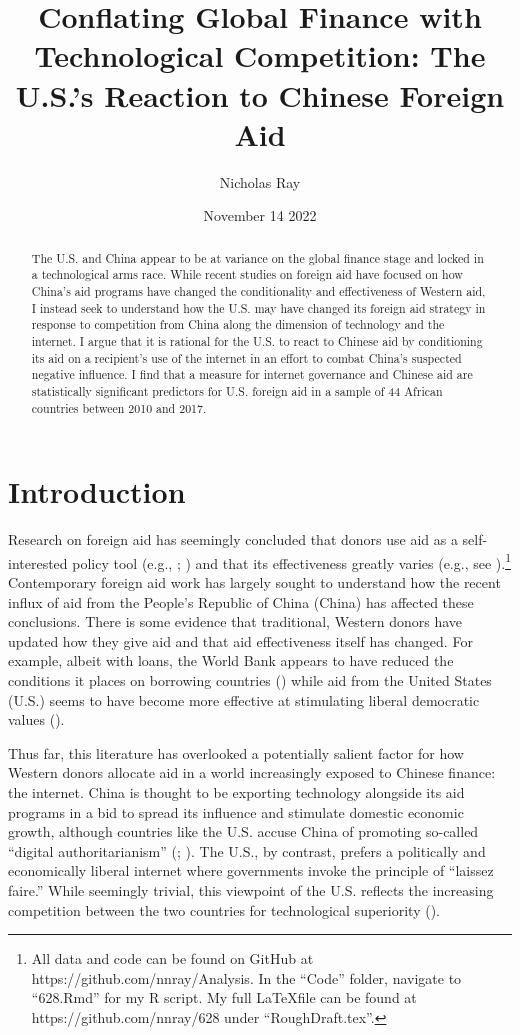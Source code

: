 \documentclass[12pt]{article}
\title{\vspace{-2.75cm}Conflating Global Finance with Technological Competition: The U.S.'s Reaction to Chinese Foreign Aid\vspace{-0.5cm}}
\author{Nicholas Ray}
\date{\vspace{-0.30cm}November 14 2022\vspace{-1cm}}
\begin{document}
\maketitle
\begin{abstract}
    The U.S. and China appear to be at variance on the global finance stage and locked in a technological arms race. While recent studies on foreign aid have focused on how China's aid programs have changed the conditionality and effectiveness of Western aid, I instead seek to understand how the U.S. may have changed its foreign aid strategy in response to competition from China along the dimension of technology and the internet. I argue that it is rational for the U.S. to react to Chinese aid by conditioning its aid on a recipient's use of the internet in an effort to combat China's suspected negative influence. I find that a measure for internet governance and Chinese aid are statistically significant predictors for U.S. foreign aid in a sample of 44 African countries between 2010 and 2017. 
\end{abstract}

\section*{Introduction}
Research on foreign aid has seemingly concluded that donors use aid as a self-interested policy tool (e.g., \cite{alesina2000}; \cite{hoeffler2011}) and that its effectiveness greatly varies (e.g., see \cite{christensen2011}).\footnote{All data and code can be found on GitHub at https://github.com/nnray/Analysis. In the ``Code'' folder, navigate to ``628.Rmd'' for my R script. My full \LaTeX \;file can be found at https://github.com/nnray/628 under ``RoughDraft.tex''.} Contemporary foreign aid work has largely sought to understand how the recent influx of aid from the People's Republic of China (China) has affected these conclusions. There is some evidence that traditional, Western donors have updated how they give aid and that aid effectiveness itself has changed. For example, albeit with loans, the World Bank appears to have reduced the conditions it places on borrowing countries (\cite{hernandez2017}) while aid from the United States (U.S.) seems to have become more effective at stimulating liberal democratic values (\cite{blair2022}).

Thus far, this literature has overlooked a potentially salient factor for how Western donors allocate aid in a world increasingly exposed to Chinese finance: the internet. China is thought to be exporting technology alongside its aid programs in a bid to spread its influence and stimulate domestic economic growth, although countries like the U.S. accuse China of promoting so-called ``digital authoritarianism'' (\cite{u.s.departmentofstate2010}; \cite{u.s.departmentofstate2022}). The U.S., by contrast, prefers a politically and economically liberal internet where governments invoke the principle of ``laissez faire.'' While seemingly trivial, this viewpoint of the U.S. reflects the increasing competition between the two countries for technological superiority (\cite{hassetal.2021}). 
\end{document}
